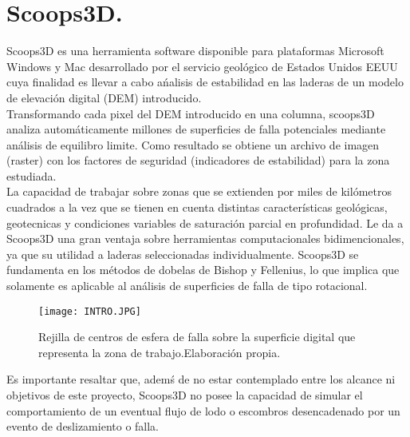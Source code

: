 \chapter{Scoops3D.}
Scoops3D es una herramienta software disponible para plataformas Microsoft Windows y Mac desarrollado por el servicio geol\'ogico de Estados Unidos EEUU cuya finalidad es llevar a cabo a\'nalisis de estabilidad en las laderas de un modelo de elevaci\'on digital (DEM) introducido.\\

Transformando cada pixel del DEM  introducido en una columna, scoops3D analiza autom\'aticamente millones de superficies de falla potenciales mediante an\'alisis de equilibro limite.  Como resultado se obtiene un archivo de imagen (raster) con los factores de seguridad (indicadores de estabilidad) para la zona estudiada.\\

La capacidad de trabajar sobre zonas que se extienden por miles de kil\'ometros cuadrados a la vez que se tienen en cuenta distintas caracter\'isticas geol\'ogicas, geotecnicas y condiciones variables de saturaci\'on parcial en profundidad. Le da a Scoops3D una gran ventaja sobre herramientas computacionales  bidimencionales, ya que su utilidad a laderas seleccionadas individualmente.
Scoops3D se fundamenta en los m\'etodos de dobelas de Bishop y Fellenius, lo que implica que solamente es aplicable al an\'alisis de superficies de falla de tipo rotacional.

\begin{figure}[H]
\centering
\texttt{[image: INTRO.JPG]}
\caption{Rejilla de centros de esfera de falla sobre la superficie digital que representa la zona de trabajo.Elaboraci\'on propia.}
\end{figure}
Es importante resaltar que, adem\'s de no estar contemplado entre los alcance ni objetivos de este proyecto, Scoops3D no posee la capacidad de simular el comportamiento de un eventual flujo de lodo o escombros desencadenado por un evento de deslizamiento o falla. 